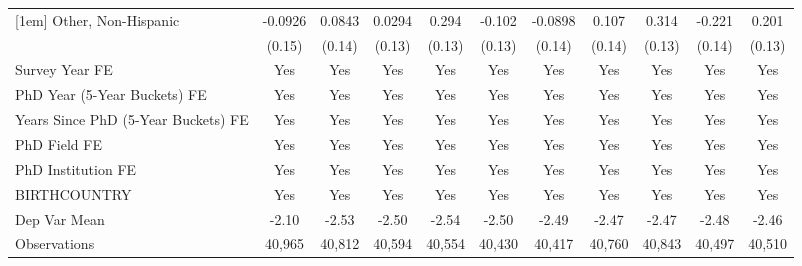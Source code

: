 \begin{table}[htbp]
\begin{tabular}{l*{10}{c}}
[1em]
Other, Non-Hispanic&     -0.0926         &      0.0843         &      0.0294         &       0.294\sym{**} &      -0.102         &     -0.0898         &       0.107         &       0.314\sym{**} &      -0.221         &       0.201         \\
  &      (0.15)         &      (0.14)         &      (0.13)         &      (0.13)         &      (0.13)         &      (0.14)         &      (0.14)         &      (0.13)         &      (0.14)         &      (0.13)         \\
[1em]
Survey Year FE&         Yes         &         Yes         &         Yes         &         Yes         &         Yes         &         Yes         &         Yes         &         Yes         &         Yes         &         Yes         \\
[1em]
PhD Year (5-Year Buckets) FE&         Yes         &         Yes         &         Yes         &         Yes         &         Yes         &         Yes         &         Yes         &         Yes         &         Yes         &         Yes         \\
[1em]
Years Since PhD (5-Year Buckets) FE&         Yes         &         Yes         &         Yes         &         Yes         &         Yes         &         Yes         &         Yes         &         Yes         &         Yes         &         Yes         \\
[1em]
PhD Field FE&         Yes         &         Yes         &         Yes         &         Yes         &         Yes         &         Yes         &         Yes         &         Yes         &         Yes         &         Yes         \\
[1em]
PhD Institution FE&         Yes         &         Yes         &         Yes         &         Yes         &         Yes         &         Yes         &         Yes         &         Yes         &         Yes         &         Yes         \\
[1em]
BIRTHCOUNTRY&         Yes         &         Yes         &         Yes         &         Yes         &         Yes         &         Yes         &         Yes         &         Yes         &         Yes         &         Yes         \\
\hline
Dep Var Mean&       -2.10         &       -2.53         &       -2.50         &       -2.54         &       -2.50         &       -2.49         &       -2.47         &       -2.47         &       -2.48         &       -2.46         \\
Observations&      40,965         &      40,812         &      40,594         &      40,554         &      40,430         &      40,417         &      40,760         &      40,843         &      40,497         &      40,510         \\

\end{tabular}
\end{table}
